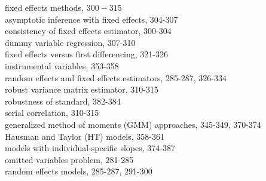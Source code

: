\documentclass[10pt]{article}
\begin{document}
fixed effects methods, $300-315$\\
asymptotic inference with fixed effects, 304-307\\
consistency of fixed effects estimator, 300-304\\
dummy variable regression, 307-310\\
fixed effects versus first differencing, 321-326\\
instrumental variables, 353-358\\
random effects and fixed effects estimators, 285-287, 326-334\\
robust variance matrix estimator, 310-315\\
robustness of standard, 382-384\\
serial correlation, 310-315\\
generalized method of moments (GMM) approaches, 345-349, 370-374\\
Hausman and Taylor (HT) models, 358-361\\
models with individual-specific slopes, 374-387\\
omitted variables problem, 281-285\\
random effects models, 285-287, 291-300
\end{document}
